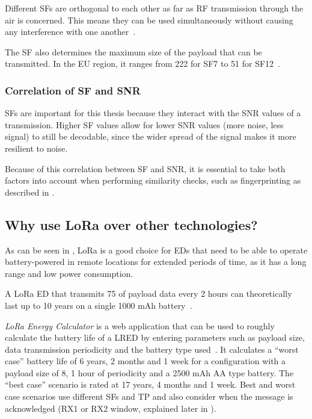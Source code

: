Different \aclp{SF} are orthogonal to each other as far as \ac{RF} transmission through the air is concerned.
This means they can be used simultaneously without causing any interference with one another~\cite{the_things_network_spreading_2023}.

The \ac{SF} also determines the maximum size of the payload that can be transmitted.
In the \ac{EU} region, it ranges from \SI{222}{\byte} for \ac{SF}7 to \SI{51}{\byte} for \ac{SF}12~\cite[p. 10f]{lora_alliance_inc_lorawan_regional_2017}.

\subsubsection{Correlation of \acs{SF} and \acs{SNR}}\label{sec:sf-snr-correlation}

\aclp{SF} are important for this thesis because they interact with the \ac{SNR} values of a transmission.
Higher \ac{SF} values allow for lower \ac{SNR} values (more noise, less signal) to still be decodable, since the wider spread of the signal makes it more resilient to noise.

Because of this correlation between \acl{SF} and \acl{SNR}, it is essential to take both factors into account when performing similarity checks, such as fingerprinting as described in .

\subsection{Why use \acs{LoRa} over other technologies?}

As can be seen in , \ac{LoRa} is a good choice for \aclp{ED} that need to be able to operate battery-powered in remote locations for extended periods of time, as it has a long range and low power consumption.

A \ac{LoRa} \acl{ED} that transmits \SI{75}{\byte} of payload data every 2 hours can theoretically last up to 10 years on a single 1000 mAh battery~\cite{cheong_comparison_2017}.

\emph{LoRa Energy Calculator} is a web application that can be used to roughly calculate the battery life of a \acl{LRED} by entering parameters such as payload size, data transmission periodicity and the battery type used~\cite{dramco_research_group_lora_2023}.
It calculates a ``worst case'' battery life of 6 years, 2 months and 1 week for a configuration with a payload size of \SI{8}{\byte}, 1 hour of periodicity and a 2500 mAh AA type battery.
The ``best case'' scenario is rated at 17 years, 4 months and 1 week.
Best and worst case scenarios use different \aclp{SF} and \ac{TP} and also consider when the message is acknowledged (RX1 or RX2 window, explained later in ).

